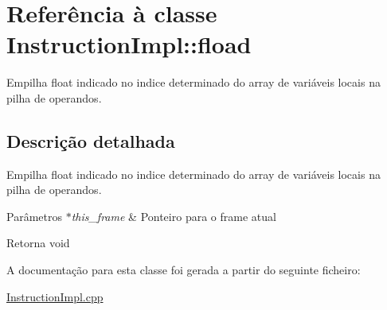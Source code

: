 \hypertarget{class_instruction_impl_1_1fload}{}\section{Referência à classe Instruction\+Impl\+:\+:fload}
\label{class_instruction_impl_1_1fload}


Empilha float indicado no indice determinado do array de variáveis locais na pilha de operandos.  




\subsection{Descrição detalhada}
Empilha float indicado no indice determinado do array de variáveis locais na pilha de operandos. 


\begin{DoxyParams}{Parâmetros}
{\em $\ast$this\+\_\+frame} & Ponteiro para o frame atual \\
\hline
\end{DoxyParams}
\begin{DoxyReturn}{Retorna}
void 
\end{DoxyReturn}


A documentação para esta classe foi gerada a partir do seguinte ficheiro\+:\begin{DoxyCompactItemize}
\item 
\hyperlink{_instruction_impl_8cpp}{Instruction\+Impl.\+cpp}\end{DoxyCompactItemize}
